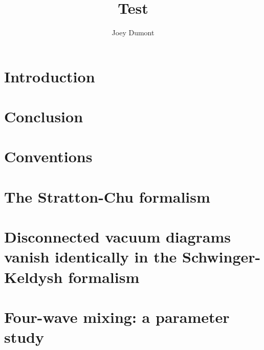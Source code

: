 \documentclass{inrsthesis}
\title{Test}
\author{Joey Dumont}
\begin{document}
\begin{titlingpage}
\maketitle
\end{titlingpage}

\frontmatter

\tableofcontents

\mainmatter

\chapter{Introduction}

\chapter{Conclusion}

\backmatter

\appendix

\chapter{Conventions}

\chapter{The Stratton-Chu formalism}

\chapter{Disconnected vacuum diagrams vanish identically in the Schwinger-Keldysh formalism}

\chapter{Four-wave mixing: a parameter study}
\end{document}
